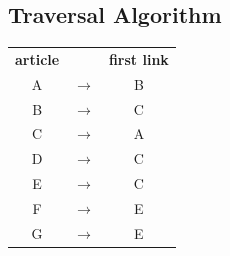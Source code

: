 \documentclass[a4paper, 12pt]{article}
\title{}
\date{}
\newcommand{\bt}[1]{\textbf{#1}} %
\begin{document}
\begin{center}
\section*{Traversal Algorithm}
\end{center}

\begin{tabular}{ c  c c } 
\bt{article} & & \bt{first link } \\
 A & $\rightarrow$&  B\\ 
 B & $\rightarrow$&  C\\ 
 C & $\rightarrow$&  A\\ 
 D & $\rightarrow$&  C\\ 
 E & $\rightarrow$&  C\\ 
 F & $\rightarrow$&  E\\ 
 G & $\rightarrow$&  E\\ 
\end{tabular}
\end{document}

